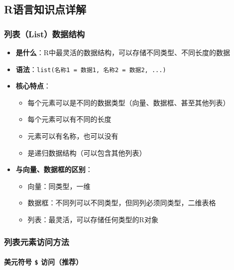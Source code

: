\documentclass[
]{book}
\providecommand{\tightlist}{%
  \setlength{\itemsep}{0pt}\setlength{\parskip}{0pt}}
\begin{document}
\hypertarget{rux8bedux8a00ux77e5ux8bc6ux70b9ux8be6ux89e3-3}{%
\subsection{R语言知识点详解}\label{rux8bedux8a00ux77e5ux8bc6ux70b9ux8be6ux89e3-3}}

\hypertarget{ux5217ux8868listux6570ux636eux7ed3ux6784}{%
\subsubsection{列表（List）数据结构}\label{ux5217ux8868listux6570ux636eux7ed3ux6784}}

\begin{itemize}
\tightlist
\item
  \textbf{是什么}：R中最灵活的数据结构，可以存储不同类型、不同长度的数据
\item
  \textbf{语法}：\texttt{list(名称1\ =\ 数据1,\ 名称2\ =\ 数据2,\ ...)}
\item
  \textbf{核心特点}：

  \begin{itemize}
  \tightlist
  \item
    每个元素可以是不同的数据类型（向量、数据框、甚至其他列表）
  \item
    每个元素可以有不同的长度
  \item
    元素可以有名称，也可以没有
  \item
    是递归数据结构（可以包含其他列表）
  \end{itemize}
\item
  \textbf{与向量、数据框的区别}：

  \begin{itemize}
  \tightlist
  \item
    向量：同类型，一维
  \item
    数据框：不同列可以不同类型，但同列必须同类型，二维表格
  \item
    列表：最灵活，可以存储任何类型的R对象
  \end{itemize}
\end{itemize}

\hypertarget{ux5217ux8868ux5143ux7d20ux8bbfux95eeux65b9ux6cd5}{%
\subsubsection{列表元素访问方法}\label{ux5217ux8868ux5143ux7d20ux8bbfux95eeux65b9ux6cd5}}

\hypertarget{ux7f8eux5143ux7b26ux53f7-ux8bbfux95eeux63a8ux8350}{%
\paragraph{\texorpdfstring{美元符号 \texttt{\$} 访问（推荐）}{美元符号 \$ 访问（推荐）}}\label{ux7f8eux5143ux7b26ux53f7-ux8bbfux95eeux63a8ux8350}}
\end{document}
